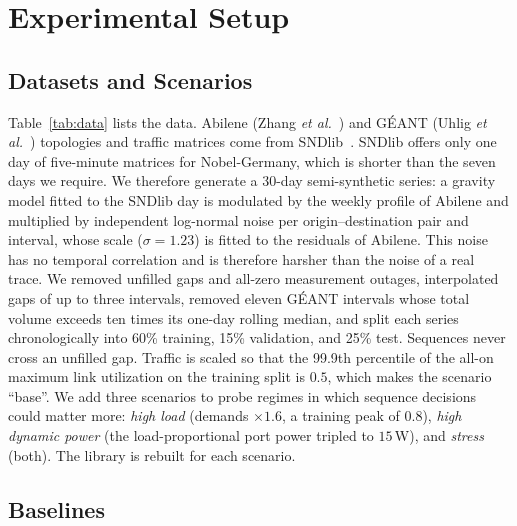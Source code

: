 \documentclass[journal]{IEEEtran}
\begin{document}
\section{Experimental Setup}\label{sec:setup}

\subsection{Datasets and Scenarios}

Table~\ref{tab:data} lists the data. Abilene (Zhang \emph{et al.}~\cite{zhang2003tomogravity}) and G\'{E}ANT (Uhlig \emph{et al.}~\cite{uhlig2006geant}) topologies and traffic matrices come from SNDlib~\cite{orlowski2010sndlib}. SNDlib offers only one day of five-minute matrices for Nobel-Germany, which is shorter than the seven days we require. We therefore generate a 30-day semi-synthetic series: a gravity model fitted to the SNDlib day is modulated by the weekly profile of Abilene and multiplied by independent log-normal noise per origin--destination pair and interval, whose scale ($\sigma=1.23$) is fitted to the residuals of Abilene. This noise has no temporal correlation and is therefore harsher than the noise of a real trace. We removed unfilled gaps and all-zero measurement outages, interpolated gaps of up to three intervals, removed eleven G\'{E}ANT intervals whose total volume exceeds ten times its one-day rolling median, and split each series chronologically into 60\% training, 15\% validation, and 25\% test. Sequences never cross an unfilled gap. Traffic is scaled so that the 99.9th percentile of the all-on maximum link utilization on the training split is $0.5$, which makes the scenario ``base''. We add three scenarios to probe regimes in which sequence decisions could matter more: \emph{high load} (demands $\times1.6$, a training peak of $0.8$), \emph{high dynamic power} (the load-proportional port power tripled to $15$\,W), and \emph{stress} (both). The library is rebuilt for each scenario.

\begin{table}[t]
\centering
\caption{Topologies and Traffic Data}
\label{tab:data}
\footnotesize
\setlength{\tabcolsep}{2.5pt}

\end{table}

\subsection{Baselines}
\end{document}
